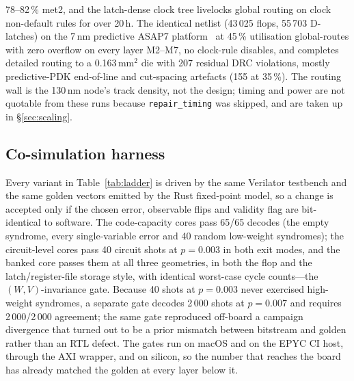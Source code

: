 78--82\,\% met2, and the latch-dense clock tree livelocks global routing on
clock non-default rules for over 20\,h.
The identical netlist (43\,025 flops, 55\,703 D-latches) on the 7\,nm
predictive ASAP7 platform~\citep{clark2016asap7} at 45\,\% utilisation
global-routes with zero overflow on every layer M2--M7, no clock-rule
disables, and completes detailed routing to a 0.163\,mm$^2$ die with 207
residual DRC violations, mostly predictive-PDK end-of-line and cut-spacing
artefacts (155 at 35\,\%). The routing wall is the 130\,nm node's track
density, not the design; timing and power are not quotable from these
runs because \texttt{repair\_timing} was skipped, and are taken up in
\S\ref{sec:scaling}.

\subsection*{Co-simulation harness}
Every variant in Table~\ref{tab:ladder} is driven by the same Verilator
testbench and the same golden vectors emitted by the Rust fixed-point model,
so a change is accepted only if the chosen error, observable flips and
validity flag are bit-identical to software. The code-capacity cores pass
65/65 decodes (the empty syndrome, every single-variable error and 40 random
low-weight syndromes);
the circuit-level cores pass 40 circuit shots at $p=0.003$ in both exit
modes, and the banked core passes them at all three geometries, in both the
flop and the latch/register-file storage style, with identical worst-case
cycle counts---the $(W,V)$-invariance gate.
Because 40 shots at $p=0.003$ never exercised high-weight syndromes, a
separate gate decodes 2\,000 shots at $p=0.007$ and requires 2\,000/2\,000
agreement; the same gate reproduced off-board a campaign divergence that
turned out to be a prior mismatch between bitstream and golden rather than
an RTL defect.
The gates run on macOS and on the EPYC CI host, through the AXI wrapper,
and on silicon, so the number that reaches the board has already matched
the golden at every layer below it.
